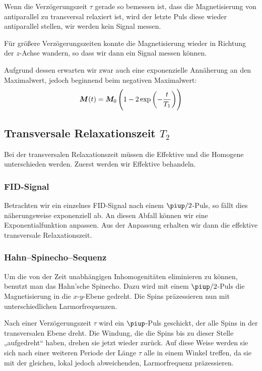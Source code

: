 Wenn die Verzögerungszeit $\tau$ gerade so bemessen ist, dass die Magnetisierung von
antiparallel zu transversal relaxiert ist, wird der letzte Puls diese wieder
antiparallel stellen, wir werden kein Signal messen.

Für größere Verzögerungszeiten konnte die Magnetisierung wieder in Richtung der
$z$-Achse wandern, so dass wir dann ein Signal messen können.

Aufgrund dessen erwarten wir zwar auch eine exponenzielle Annäherung an den
Maximalwert, jedoch beginnend beim negativen Maximalwert:
\parencite[Formel~P443.4]{physik412-Anleitung}
\begin{equation}
    \label{eq:M/exp/2}
    \vec M(t) = \vec M_0 \del{1 - 2 \exp\del{- \frac{t}{T_1}}}
\end{equation}

\subsection{Transversale Relaxationszeit $T_2$}

Bei der transversalen Relaxationszeit müssen die Effektive und die Homogene
unterschieden werden. Zuerst werden wir Effektive behandeln.

\subsubsection{FID-Signal}

Betrachten wir ein einzelnes FID-Signal nach einem $\piup/2$-Puls, so fällt dies
näherungsweise exponenziell ab. An diesen Abfall können wir eine
Exponentialfunktion anpassen. Aus der Anpassung erhalten wir dann die effektive
transversale Relaxationszeit.

\subsubsection{Hahn–Spinecho–Sequenz}

Um die von der Zeit unabhängigen Inhomogenitäten eliminieren zu können, benutzt
man das Hahn'sche Spinecho. Dazu wird mit einem $\piup/2$-Puls die
Magnetisierung in die $x$-$y$-Ebene gedreht. Die Spins präzessieren nun mit
unterschiedlichen Larmorfrequenzen.

Nach einer Verzögerungszeit $\tau$ wird ein $\piup$-Puls geschickt, der alle
Spins in der transversalen Ebene dreht. Die Windung, die die Spins bis zu
dieser Stelle „aufgedreht“ haben, drehen sie jetzt wieder zurück. Auf diese
Weise werden sie sich nach einer weiteren Periode der Länge $\tau$ alle in
einem Winkel treffen, da sie mit der gleichen, lokal jedoch abweichenden,
Larmorfrequenz präzessieren.

